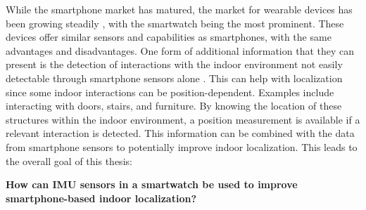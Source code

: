 While the smartphone market has matured, the market for wearable devices has been growing steadily \cite{jung2016consumer}, with the smartwatch being the most prominent. These devices offer similar sensors and capabilities as smartphones, with the same advantages and disadvantages. One form of additional information that they can present is the detection of interactions with the indoor environment not easily detectable through smartphone sensors alone \cite{Shoaib2015}. This can help with localization since some indoor interactions can be position-dependent. Examples include interacting with doors, stairs, and furniture. By knowing the location of these structures within the indoor environment, a position measurement is available if a relevant interaction is detected. This information can be combined with the data from smartphone sensors to potentially improve indoor localization.
This leads to the overall goal of this thesis:

\textbf{How can IMU sensors in a smartwatch be used to improve smartphone-based indoor localization?}




 


